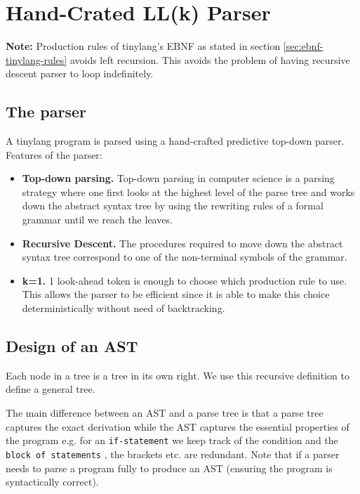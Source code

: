 \chapter{Hand-Crated LL(k) Parser}
\textbf{Note: } Production rules of tinylang’s EBNF as stated
in section \ref{sec:ebnf-tinylang-rules} avoids left recursion. This avoids the problem of having recursive descent parser to loop indefinitely.
\section{The parser}
A tinylang program is parsed using a hand-crafted predictive top-down
parser.
Features of the parser:
\begin{itemize}
    \item \textbf{Top-down parsing.} Top-down parsing in computer science is a parsing strategy where one first looks at the highest level of the parse tree and works down the abstract syntax tree by using the rewriting rules of a formal grammar until we reach the leaves.
    \item  \textbf{Recursive Descent.} The procedures required to move down the abstract syntax tree correspond to one of the non-terminal symbols of the grammar.
    \item \textbf{k=1.} 1 look-ahead token is enough to choose which production rule to use. This allows the parser to be eﬀicient since it is able to make this choice deterministically without need of backtracking.
\end{itemize}



\section{Design of an AST}
\label{sec:design of an ast}
Each node in a tree is a tree in its own right.  We use this recursive definition to define a general tree.

The main difference between an AST and a parse tree is that a parse tree captures the exact derivation while the AST captures the essential properties of the program   e.g. for an \verb!if-statement! we keep track of the condition and the \verb!block of statements! , the brackets etc. are redundant. Note  that if a parser needs to parse a program fully to produce an AST (ensuring the program is syntactically correct).


